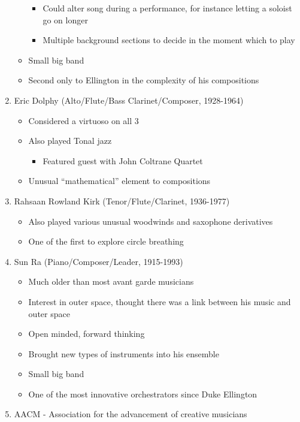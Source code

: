 \documentclass[]{article}
\providecommand{\tightlist}{%
  \setlength{\itemsep}{0pt}\setlength{\parskip}{0pt}}
\begin{document}
\begin{enumerate}
\begin{itemize}
    \begin{itemize}
    \tightlist
    \item
      Could alter song during a performance, for instance letting a
      soloist go on longer
    \item
      Multiple background sections to decide in the moment which to play
    \end{itemize}
  \item
    Small big band
  \item
    Second only to Ellington in the complexity of his compositions
  \end{itemize}
\item
  Eric Dolphy (Alto/Flute/Bass Clarinet/Composer, 1928-1964)

  \begin{itemize}
  \tightlist
  \item
    Considered a virtuoso on all 3
  \item
    Also played Tonal jazz

    \begin{itemize}
    \tightlist
    \item
      Featured guest with John Coltrane Quartet
    \end{itemize}
  \item
    Unusual ``mathematical'' element to compositions
  \end{itemize}
\item
  Rahsaan Rowland Kirk (Tenor/Flute/Clarinet, 1936-1977)

  \begin{itemize}
  \tightlist
  \item
    Also played various unusual woodwinds and saxophone derivatives
  \item
    One of the first to explore circle breathing
  \end{itemize}
\item
  Sun Ra (Piano/Composer/Leader, 1915-1993)

  \begin{itemize}
  \tightlist
  \item
    Much older than most avant garde musicians
  \item
    Interest in outer space, thought there was a link between his music
    and outer space
  \item
    Open minded, forward thinking
  \item
    Brought new types of instruments into his ensemble
  \item
    Small big band
  \item
    One of the most innovative orchestrators since Duke Ellington
  \end{itemize}
\item
  AACM - Association for the advancement of creative musicians


\end{enumerate}
\end{document}
